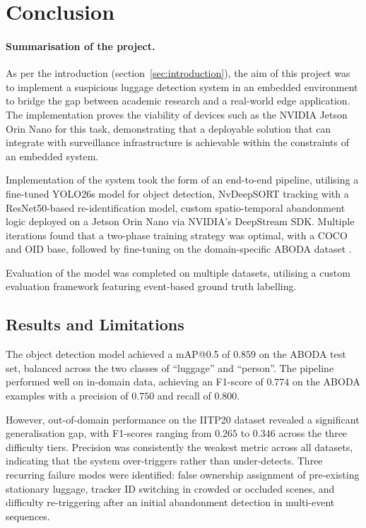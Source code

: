 \section{Conclusion}

\paragraph{Summarisation of the project.}

As per the introduction (section~\ref{sec:introduction}), the aim of this
project was to implement a suspicious luggage detection system in an embedded
environment to bridge the gap between academic research and a real-world edge
application. The implementation proves the viability of devices such as the
NVIDIA Jetson Orin Nano for this task, demonstrating that a deployable solution
that can integrate with surveillance infrastructure is achievable within the
constraints of an embedded system.

Implementation of the system took the form of an end-to-end pipeline, utilising
a fine-tuned YOLO26s model for object detection, NvDeepSORT tracking with a
ResNet50-based re-identification model, custom spatio-temporal abandonment
logic deployed on a Jetson Orin Nano via NVIDIA's DeepStream SDK. Multiple
iterations found that a two-phase training strategy was optimal, with a COCO
\citep{lin2014microsoft} and OID \citep{krasin2017openimages} base, followed by
fine-tuning on the domain-specific ABODA dataset \citep{lin2015aboda}.

Evaluation of the model was completed on multiple datasets, utilising a custom
evaluation framework featuring event-based ground truth labelling.

\subsection{Results and Limitations}

The object detection model achieved a mAP@0.5 of $0.859$ on the ABODA test set,
balanced across the two classes of ``luggage'' and ``person''. The pipeline
performed well on in-domain data, achieving an F1-score of $0.774$ on the ABODA
examples with a precision of $0.750$ and recall of $0.800$.

However, out-of-domain performance on the IITP20 dataset revealed a significant
generalisation gap, with F1-scores ranging from $0.265$ to $0.346$ across the
three difficulty tiers. Precision was consistently the weakest metric across
all datasets, indicating that the system over-triggers rather than
under-detects. Three recurring failure modes were identified: false ownership
assignment of pre-existing stationary luggage, tracker ID switching in crowded
or occluded scenes, and difficulty re-triggering after an initial abandonment
detection in multi-event sequences.

